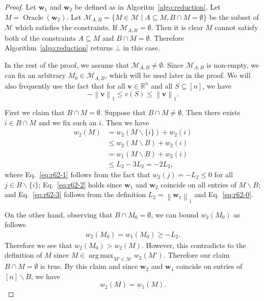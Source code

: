 \documentclass{article}
\newcommand{\M}{\mathcal M}
\newcommand{\del}{\backslash}
\newcommand{\RR}{\mathbb R}
\DeclareMathOperator*{\argmax}{arg\,max}
\DeclareMathOperator{\Oracle}{Oracle}
\newcommand{\nor}[1]{\left\|#1\right\|}
\renewcommand{\vec}[1]{\boldsymbol{#1}}
\begin{document}
\begin{proof}
Let $\vec w_1$ and $\vec w_2$ be defined as in Algoritm~\ref{algo:reduction}.
Let $M=\Oracle(\vec w_2)$.
Let $\M_{A,B} = \{M\in \M \mid A\subseteq M, B\cap M =\emptyset \}$ be the subset of $\M$ which satisfies the constraints.
If $\M_{A,B} = \emptyset$. 
Then it is clear $M$ cannot satisfy both of the constraints $A \subseteq M$ and $B \cap M =\emptyset$. 
Therefore Algorithm~\ref{algo:reduction} returns $\bot$ in this case.

In the rest of the proof, we assume that $\M_{A,B} \not=\emptyset$. 
Since $\M_{A,B}$ is non-empty, we can fix an arbitrary $M_0 \in \M_{A,B}$, which will be used later in the proof. 
We will also frequently use the fact that for all $\vec v\in \RR^{n}$ and all $S\subseteq[n]$, we have 
\begin{equation}
\label{eq:r62-0}
-\nor{\vec v}_1 \le v(S) \le \nor{\vec v}_1.
\end{equation}

First we claim that $B\cap M =\emptyset$.
Suppose that $B\cap M\not=\emptyset$. 
Then there exists $i\in B \cap M$ and we fix such an $i$.
Then we have
\begin{align}
	w_2(M) &= w_2(M\del \{i\})+w_2(i) \nonumber\\
				 &\le w_2(M \del B) + w_2(i) \label{eq:r62-1}\\
				 &= w_1(M\del B)+w_2(i) \label{eq:r62-2} \\
				 &\le L_2-3L_2 = -2L_2, \label{eq:r62-3}
\end{align}
where Eq.~\eqref{eq:r62-1} follows from the fact that $w_2(j) = -L_2 \le 0$ for all $j \in B \del \{i\}$;
Eq.~\eqref{eq:r62-2} holds since $\vec w_1$ and $\vec w_2$ coincide on all entries of $M\del B$;
and Eq.~\eqref{eq:r62-3} follows from the definition $L_2 = \nor{\vec w_1}_1$ and Eq.~\eqref{eq:r62-0}.

On the other hand, observing that $B\cap M_0=\emptyset$, we can bound $w_2(M_0)$ as follows
\begin{align*}
w_2(M_0) = w_1(M_0) \ge -L_2.
\end{align*}
Therefore we see that $w_2(M_0) > w_2(M)$.
However, this contradicts to the definition of $M$ since $M \in \argmax_{M'\in \M} w_2(M')$.
Therefore our claim $B\cap M = \emptyset$ is true.
By this claim and since $\vec w_2$ and $\vec w_1$ coincide on entries of $[n]\del B$, we have
\begin{equation}
\label{eq:rdc1}
w_2(M) = w_1(M).
\end{equation}


\end{proof}
\end{document}
